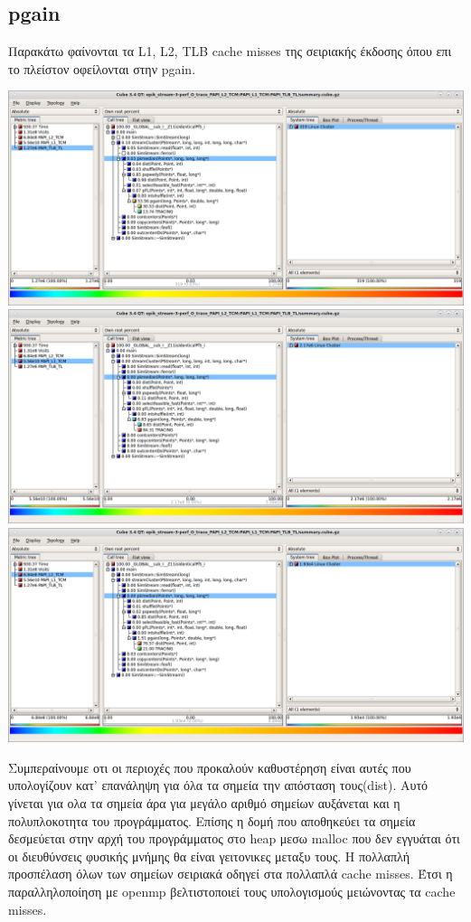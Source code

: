 \documentclass{article}
\begin{document}
\subsection{pgain}
Παρακάτω φαίνονται τα L1, L2, TLB cache misses της σειριακής έκδοσης όπου επι το πλείστον οφείλονται στην pgain.
\begin{center}
\includegraphics[scale=0.4]{../scrshots/tlb.png}
\includegraphics[scale=0.4]{../scrshots/l1.png}
\includegraphics[scale=0.4]{../scrshots/l2.png}
\end{center} 
Συμπεραίνουμε οτι οι περιοχές που προκαλούν καθυστέρηση είναι αυτές που υπολογίζουν κατ' επανάληψη για όλα τα σημεία την απόσταση τους(dist). Αυτό γίνεται για ολα τα σημεία άρα για μεγάλο αριθμό σημείων αυξάνεται και η πολυπλοκοτητα του προγράμματος. Επίσης η δομή που αποθηκεύει τα σημεία δεσμεύεται στην αρχή του προγράμματος στο heap μεσω malloc που δεν εγγυάται ότι οι διευθύνσεις φυσικής μνήμης θα είναι γειτονικες μεταξυ τους. Η πολλαπλή προσπέλαση όλων των σημείων σειριακά οδηγεί στα
πολλαπλά cache misses. Έτσι η παραλληλοποίηση με openmp βελτιστοποιεί τους υπολογισμούς μειώνοντας τα cache misses.
\end{document}
